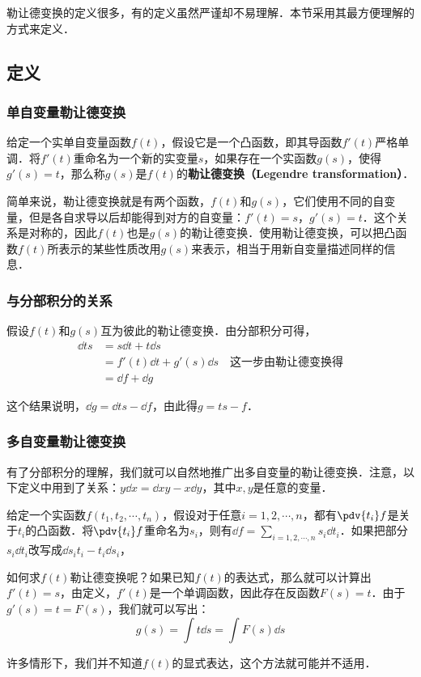 

勒让德变换的定义很多，有的定义虽然严谨却不易理解．本节采用其最方便理解的方式来定义．

\subsection{定义}

\subsubsection{单自变量勒让德变换}
\begin{definition}{}
给定一个实单自变量函数$f(t)$，假设它是一个凸函数，即其导函数$f'(t)$严格单调．将$f'(t)$重命名为一个新的实变量$s$，如果存在一个实函数$g(s)$，使得$g'(s)=t$，那么称$g(s)$是$f(t)$的\textbf{勒让德变换（Legendre transformation）}．
\end{definition}

简单来说，勒让德变换就是有两个函数，$f(t)$和$g(s)$，它们使用不同的自变量，但是各自求导以后却能得到对方的自变量：$f'(t)=s$，$g'(s)=t$．这个关系是对称的，因此$f(t)$也是$g(s)$的勒让德变换．使用勒让德变换，可以把凸函数$f(t)$所表示的某些性质改用$g(s)$来表示，相当于用新自变量描述同样的信息．

\subsubsection{与分部积分的关系}

假设$f(t)$和$g(s)$互为彼此的勒让德变换．由分部积分可得，
\begin{equation}
\begin{aligned}
\dd{ts}&=s\dd{t}+t\dd{s}\\&=f'(t)\dd{t}+g'(s)\dd{s}\quad\text{这一步由勒让德变换得}\\&=\dd{f}+\dd{g}
\end{aligned}
\end{equation}

这个结果说明，$\dd{g}=\dd{ts}-\dd{f}$，由此得$g=ts-f$．

\subsubsection{多自变量勒让德变换}

有了分部积分的理解，我们就可以自然地推广出多自变量的勒让德变换．注意，以下定义中用到了关系：$y\dd{x}=\dd{xy}-x\dd{y}$，其中$x, y$是任意的变量．

\begin{definition}{}
给定一个实函数$f(t_1, t_2, \cdots, t_n)$，假设对于任意$i=1, 2, \cdots, n$，都有$\pdv{t_i}f$是关于$t_i$的凸函数．将$\pdv{t_i}f$重命名为$s_i$，则有$\dd{f}=\sum_{i=1, 2,\cdots, n}s_i\dd{t_i}$．如果把部分$s_i\dd{t_i}$改写成$\dd{s_it_i}-t_i\dd{s_i}$，
\end{definition}

如何求$f(t)$勒让德变换呢？如果已知$f(t)$的表达式，那么就可以计算出$f'(t)=s$，由定义，$f'(t)$是一个单调函数，因此存在反函数$F(s)=t$．由于$g'(s)=t=F(s)$，我们就可以写出：
\begin{equation}
g(s)=\int t \dd{s}=\int F(s) \dd{s}
\end{equation}

许多情形下，我们并不知道$f(t)$的显式表达，这个方法就可能并不适用．


